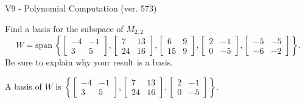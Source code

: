 \begin{exercise}
  \begin{exerciseTitle}V9 - Polynomial Computation (ver. 573)\end{exerciseTitle}
  \begin{exerciseStatement}
    Find a basis for the subspace of \(M_{2,2}\) 
\[W=\mathrm{span}\ \left\{\left[\begin{array}{cc}
-4 & -1 \\
3 & 5
\end{array}\right] , \left[\begin{array}{cc}
7 & 13 \\
24 & 16
\end{array}\right] , \left[\begin{array}{cc}
6 & 9 \\
15 & 9
\end{array}\right] , \left[\begin{array}{cc}
2 & -1 \\
0 & -5
\end{array}\right] , \left[\begin{array}{cc}
-5 & -5 \\
-6 & -2
\end{array}\right]\right\}.\]
 Be sure to explain why your result is a basis.


  \end{exerciseStatement}
  \begin{exerciseAnswer}
   A basis of \(W\) is  \(\left\{\left[\begin{array}{cc}
-4 & -1 \\
3 & 5
\end{array}\right] , \left[\begin{array}{cc}
7 & 13 \\
24 & 16
\end{array}\right] , \left[\begin{array}{cc}
2 & -1 \\
0 & -5
\end{array}\right]\right\}\).
  


  \end{exerciseAnswer}
\end{exercise}